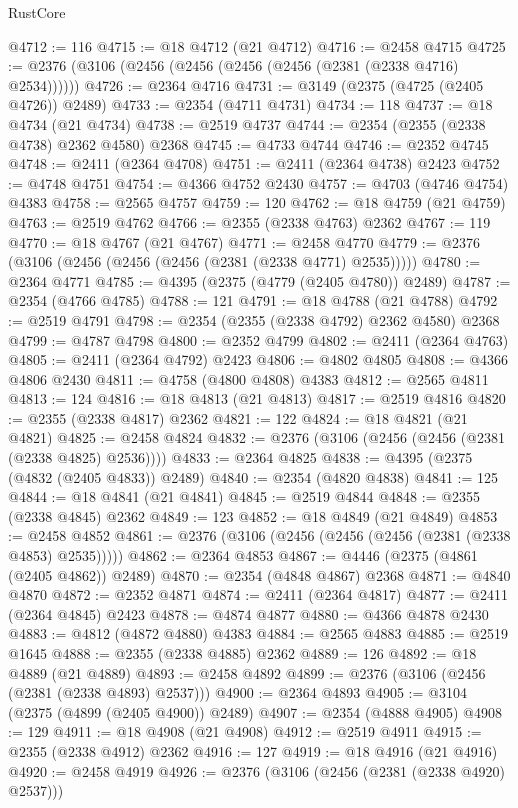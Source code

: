 \begin{lexlean}{RustCore}
\begin{coremodule}
@4712 := 116
@4715 := @18 @4712 (@21 @4712)
@4716 := @2458 @4715
@4725 := @2376 (@3106 (@2456 (@2456 (@2456 (@2456 (@2381 (@2338 @4716) @2534))))))
@4726 := @2364 @4716
@4731 := @3149 (@2375 (@4725 (@2405 @4726)) @2489)
@4733 := @2354 (@4711 @4731)
@4734 := 118
@4737 := @18 @4734 (@21 @4734)
@4738 := @2519 @4737
@4744 := @2354 (@2355 (@2338 @4738) @2362 @4580) @2368
@4745 := @4733 @4744
@4746 := @2352 @4745
@4748 := @2411 (@2364 @4708)
@4751 := @2411 (@2364 @4738) @2423
@4752 := @4748 @4751
@4754 := @4366 @4752 @2430
@4757 := @4703 (@4746 @4754) @4383
@4758 := @2565 @4757
@4759 := 120
@4762 := @18 @4759 (@21 @4759)
@4763 := @2519 @4762
@4766 := @2355 (@2338 @4763) @2362
@4767 := 119
@4770 := @18 @4767 (@21 @4767)
@4771 := @2458 @4770
@4779 := @2376 (@3106 (@2456 (@2456 (@2456 (@2381 (@2338 @4771) @2535)))))
@4780 := @2364 @4771
@4785 := @4395 (@2375 (@4779 (@2405 @4780)) @2489)
@4787 := @2354 (@4766 @4785)
@4788 := 121
@4791 := @18 @4788 (@21 @4788)
@4792 := @2519 @4791
@4798 := @2354 (@2355 (@2338 @4792) @2362 @4580) @2368
@4799 := @4787 @4798
@4800 := @2352 @4799
@4802 := @2411 (@2364 @4763)
@4805 := @2411 (@2364 @4792) @2423
@4806 := @4802 @4805
@4808 := @4366 @4806 @2430
@4811 := @4758 (@4800 @4808) @4383
@4812 := @2565 @4811
@4813 := 124
@4816 := @18 @4813 (@21 @4813)
@4817 := @2519 @4816
@4820 := @2355 (@2338 @4817) @2362
@4821 := 122
@4824 := @18 @4821 (@21 @4821)
@4825 := @2458 @4824
@4832 := @2376 (@3106 (@2456 (@2456 (@2381 (@2338 @4825) @2536))))
@4833 := @2364 @4825
@4838 := @4395 (@2375 (@4832 (@2405 @4833)) @2489)
@4840 := @2354 (@4820 @4838)
@4841 := 125
@4844 := @18 @4841 (@21 @4841)
@4845 := @2519 @4844
@4848 := @2355 (@2338 @4845) @2362
@4849 := 123
@4852 := @18 @4849 (@21 @4849)
@4853 := @2458 @4852
@4861 := @2376 (@3106 (@2456 (@2456 (@2456 (@2381 (@2338 @4853) @2535)))))
@4862 := @2364 @4853
@4867 := @4446 (@2375 (@4861 (@2405 @4862)) @2489)
@4870 := @2354 (@4848 @4867) @2368
@4871 := @4840 @4870
@4872 := @2352 @4871
@4874 := @2411 (@2364 @4817)
@4877 := @2411 (@2364 @4845) @2423
@4878 := @4874 @4877
@4880 := @4366 @4878 @2430
@4883 := @4812 (@4872 @4880) @4383
@4884 := @2565 @4883
@4885 := @2519 @1645
@4888 := @2355 (@2338 @4885) @2362
@4889 := 126
@4892 := @18 @4889 (@21 @4889)
@4893 := @2458 @4892
@4899 := @2376 (@3106 (@2456 (@2381 (@2338 @4893) @2537)))
@4900 := @2364 @4893
@4905 := @3104 (@2375 (@4899 (@2405 @4900)) @2489)
@4907 := @2354 (@4888 @4905)
@4908 := 129
@4911 := @18 @4908 (@21 @4908)
@4912 := @2519 @4911
@4915 := @2355 (@2338 @4912) @2362
@4916 := 127
@4919 := @18 @4916 (@21 @4916)
@4920 := @2458 @4919
@4926 := @2376 (@3106 (@2456 (@2381 (@2338 @4920) @2537)))

\end{coremodule}
\end{lexlean}
